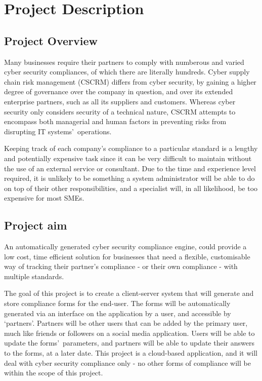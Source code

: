 \chapter{Project Description} \label{Chapter:one}
    \section{Project Overview}
        Many businesses require their partners to comply with numberous and varied cyber security compliances, of which there are literally hundreds. Cyber supply chain risk management (CSCRM) differs from cyber security, by gaining a higher degree of governance over the company in question, and over its extended enterprise partners, such as all its suppliers and customers. Whereas cyber security only considers security of a technical nature, CSCRM attempts to encompass both managerial and human factors in preventing risks from disrupting IT systems\textquoteright\ operations. \cite{CSCRM}
        
        Keeping track of each company\textquoteright s compliance to a particular standard is a lengthy and potentially expensive task since it can be very difficult to maintain without the use of an external service or consultant. Due to the time and experience level required, it is unlikely to be something a system administrator will be able to do on top of their other responsibilities, and a specialist will, in all likelihood, be too expensive for most SMEs.

    \section{Project aim}
        An automatically generated cyber security compliance engine, could provide a low cost, time efficient solution for businesses that need a flexible, customisable way of tracking their partner\textquoteright s compliance - or their own compliance - with multiple standards.

        The goal of this project is to create a client-server system that will generate and store compliance forms for the end-user. The forms will be automatically generated via an interface on the application by a user, and accessible by \textquoteleft partners\textquoteright. Partners will be other users that can be added by the primary user, much like friends or followers on a social media application. Users will be able to update the forms\textquoteright\ parameters, and partners will be able to update their answers to the forms, at a later date. This project is a cloud-based application, and it will deal with cyber security compliance only - no other forms of compliance will be within the scope of this project.
